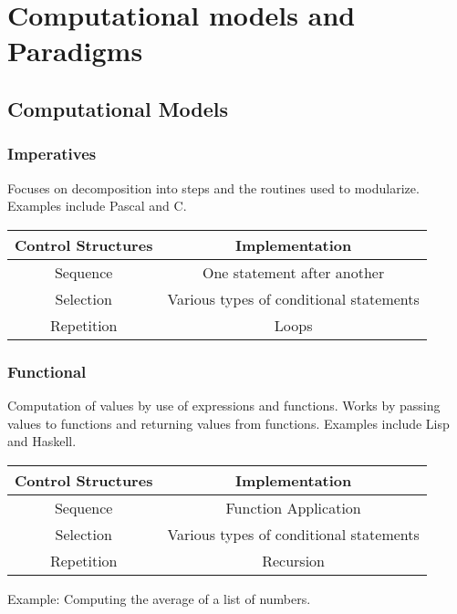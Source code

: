 \chapter{Computational models and Paradigms}

\section{Computational Models}
     \subsection{Imperatives}
     Focuses on decomposition into steps and the routines used to modularize. Examples include Pascal and C. \\
     \begin{table}[H]
        \begin{tabular}{cc}
            \textbf{Control Structures} & \textbf{Implementation} \\
            \midrule
            Sequence & One statement after another \\
            Selection & Various types of conditional statements \\
            Repetition & Loops \\
            \bottomrule        
        \end{tabular}
     \end{table}
     \subsection{Functional}
     Computation of values by use of expressions and functions. Works by passing values to functions and returning values from functions. Examples include Lisp and Haskell. \\
    \begin{table}[H]
        \begin{tabular}{cc}
            \textbf{Control Structures} & \textbf{Implementation} \\
            \midrule
            Sequence & Function Application \\
            Selection & Various types of conditional statements \\
            Repetition & Recursion \\
            \bottomrule        
        \end{tabular}
    \end{table}
    Example: Computing the average of a list of numbers. \\
